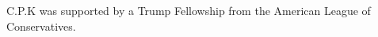\documentclass{pnastwo}
\begin{document}
\begin{article}
%
%



%


 

 
%
%
%
%
%





\begin{acknowledgments}
C.P.K was supported by a Trump Fellowship from the American League of Conservatives.
\end{acknowledgments}






\end{article}
\end{document}

